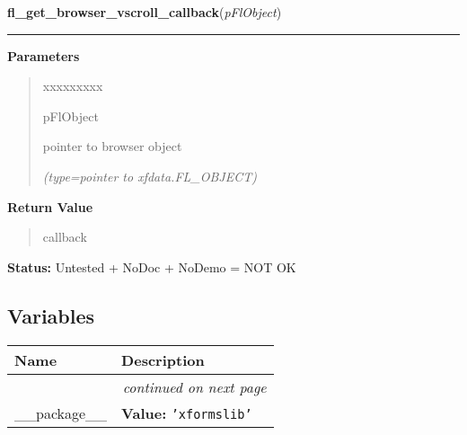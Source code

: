 \hspace{.8\funcindent}\begin{boxedminipage}{\funcwidth}

    \raggedright \textbf{fl\_get\_browser\_vscroll\_callback}(\textit{pFlObject})

    \vspace{-1.5ex}

    \rule{\textwidth}{0.5\fboxrule}
\setlength{\parskip}{2ex}
\setlength{\parskip}{1ex}
      \textbf{Parameters}
      \vspace{-1ex}

      \begin{quote}
        \begin{Ventry}{xxxxxxxxx}

          \item[pFlObject]

          pointer to browser object

            {\it (type=pointer to xfdata.FL\_OBJECT)}

        \end{Ventry}

      \end{quote}

      \textbf{Return Value}
    \vspace{-1ex}

      \begin{quote}
      callback

      \end{quote}

\textbf{Status:} Untested + NoDoc + NoDemo = NOT OK



    \end{boxedminipage}



  \subsection{Variables}

    \vspace{-1cm}
\hspace{\varindent}\begin{longtable}{|p{\varnamewidth}|p{\vardescrwidth}|l}
\cline{1-2}
\cline{1-2} \centering \textbf{Name} & \centering \textbf{Description}& \\
\cline{1-2}
\endhead\cline{1-2}\multicolumn{3}{r}{\small\textit{continued on next page}}\\\endfoot\cline{1-2}
\endlastfoot\raggedright \_\-\_\-p\-a\-c\-k\-a\-g\-e\-\_\-\_\- & \raggedright \textbf{Value:} 
{\tt \texttt{'}\texttt{xformslib}\texttt{'}}&\\
\cline{1-2}
\end{longtable}

